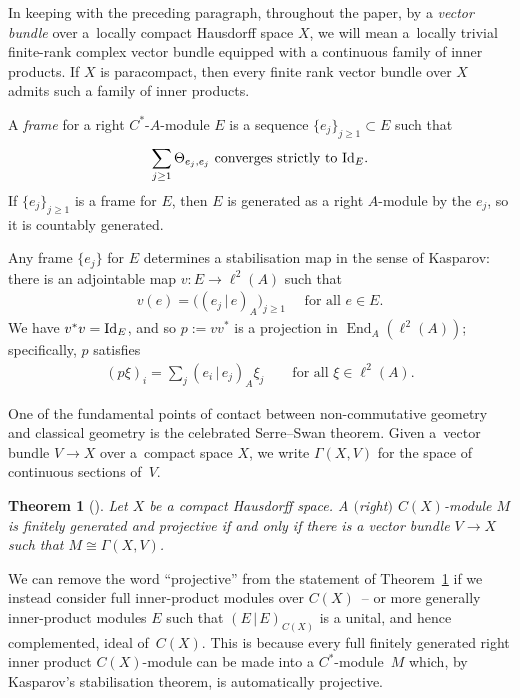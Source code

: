 \documentclass[10pt,a4paper]{amsart}
\numberwithin{equation}{section}
\newtheorem{thm}{Theorem}[section]
\DeclareMathOperator{\End}{End} %
\begin{document}
In keeping with the preceding paragraph, throughout the paper, by a \emph{vector bundle} over a~locally compact Hausdorf\/f space $X$, we will mean a~locally trivial f\/inite-rank complex vector bundle equipped with a continuous family of inner products. If $X$ is paracompact, then every f\/inite rank vector bundle over $X$ admits such a family of inner products.

A \emph{frame} for a right $C^*$-$A$-module $E$ is a sequence $\{e_j\}_{j\geq 1}\subset E$ such that
\begin{gather*}
\sum_{j\geq 1}\Theta_{e_j,e_j}\text{ converges strictly to }{\rm Id}_E.%
\end{gather*}
If $\{e_j\}_{j \ge 1}$ is a frame for $E$, then $E$ is generated as a right $A$-module by the $e_j$, so it is countably generated.

Any frame $\{e_j\}$ for $E$ determines a stabilisation map in the sense of Kasparov: there is an adjointable map $v \colon E \to \ell^2(A)$ such that
\begin{gather*}%
v(e) = \big((e_j \,|\, e)_A\big)_{j\geq 1}\quad\text{ for all $e \in E$.}
\end{gather*}
We have $v^*v={\rm Id}_E$, and so $p := vv^*$ is a projection in $\End_A(\ell^2(A))$; specif\/ically, $p$ satisf\/ies
\begin{gather*}
(p \xi)_i = \sum_j (e_i \,|\, e_j)_A \xi_j \qquad\text{for all $\xi \in \ell^2(A)$.}
\end{gather*}

One of the fundamental points of contact between non-commutative geometry and classical geometry is the celebrated Serre--Swan theorem. Given a~vector bundle $V \to X$ over a~compact space $X$, we write $\Gamma(X, V)$ for the space of continuous sections of~$V$.

\begin{thm}[\cite{Swan}]\label{thm:SS} Let $X$ be a compact Hausdorff space. A $($right$)$ $C(X)$-module $M$ is finitely generated and projective if and only if there is a vector bundle $V\to X$ such that $M\cong \Gamma(X,V)$.
\end{thm}

We can remove the word ``projective'' from the statement of Theorem~\ref{thm:SS} if we instead consider full inner-product modules over $C(X)$~-- or more generally inner-product modules $E$ such that $(E \,|\, E)_{C(X)}$ is a unital, and hence complemented, ideal of~$C(X)$. This is because every full f\/initely generated right inner product $C(X)$-module can be made into a $C^*$-module~$M$ which, by Kasparov's stabilisation theorem, is automatically projective.
\end{document}

